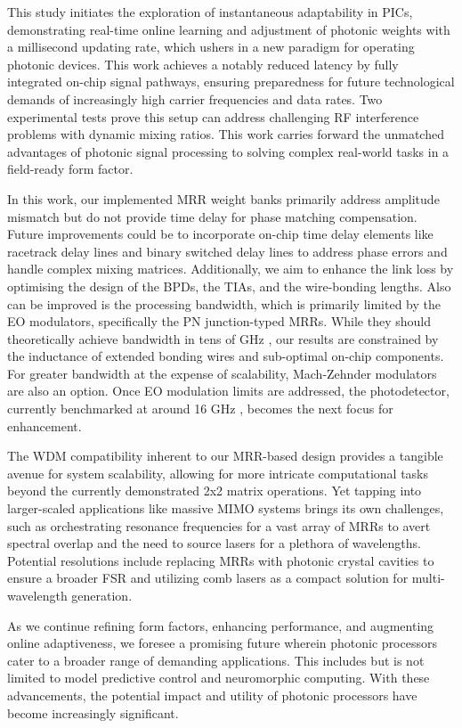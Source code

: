 \documentclass[pdflatex,mathphys]{sty}%
\begin{document}
This study initiates the exploration of instantaneous adaptability in PICs, demonstrating real-time online learning and adjustment of photonic weights with a millisecond updating rate, which ushers in a new paradigm for operating photonic devices. This work achieves a notably reduced latency by fully integrated on-chip signal pathways, ensuring preparedness for future technological demands of increasingly high carrier frequencies and data rates. Two experimental tests prove this setup can address challenging RF interference problems with dynamic mixing ratios. This work carries forward the unmatched advantages of photonic signal processing to solving complex real-world tasks in a field-ready form factor. 

In this work, our implemented MRR weight banks primarily address amplitude mismatch but do not provide time delay for phase matching compensation. Future improvements could be to incorporate on-chip time delay elements like racetrack delay lines \cite{melloni2010tunable} and binary switched delay lines to address phase errors and handle complex mixing matrices. Additionally, we aim to enhance the link loss by optimising the design of the BPDs, the TIAs, and the wire-bonding lengths. Also can be improved is the processing bandwidth, which is primarily limited by the EO modulators, specifically the PN junction-typed MRRs. While they should theoretically achieve bandwidth in tens of GHz \cite{zhang2020200}, our results are constrained by the inductance of extended bonding wires and sub-optimal on-chip components. For greater bandwidth at the expense of scalability, Mach-Zehnder modulators are also an option. Once EO modulation limits are addressed, the photodetector, currently benchmarked at around 16 GHz \cite{hai201316}, becomes the next focus for enhancement.

The WDM compatibility inherent to our MRR-based design provides a tangible avenue for system scalability, allowing for more intricate computational tasks beyond the currently demonstrated 2x2 matrix operations. Yet tapping into larger-scaled applications like massive MIMO systems brings its own challenges, such as orchestrating resonance frequencies for a vast array of MRRs to avert spectral overlap and the need to source lasers for a plethora of wavelengths. Potential resolutions include replacing MRRs with photonic crystal cavities to ensure a broader FSR and utilizing comb lasers as a compact solution for multi-wavelength generation.

As we continue refining form factors, enhancing performance, and augmenting online adaptiveness, we foresee a promising future wherein photonic processors cater to a broader range of demanding applications. This includes but is not limited to model predictive control \cite{huang2022prospects,de2019machine} and neuromorphic computing. With these advancements, the potential impact and utility of photonic processors have become increasingly significant.
\end{document}
